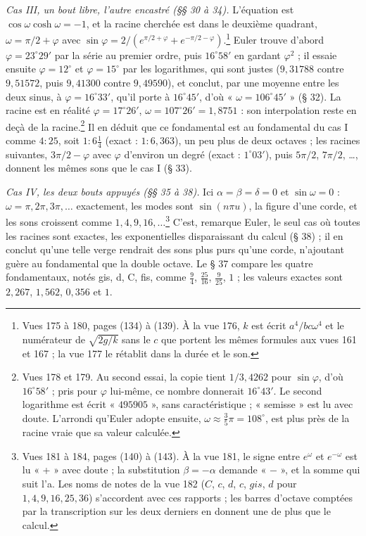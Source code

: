 \documentclass[11pt,a4paper]{article}
\begin{document}
\emph{Cas III, un bout libre, l'autre encastré (§§ 30 à 34).} L'équation est $\cos\omega\cosh\omega=-1$, et la racine cherchée est dans le deuxième quadrant, $\omega=\pi/2+\varphi$ avec $\sin\varphi=2/(e^{\pi/2+\varphi}+e^{-\pi/2-\varphi})$.\footnote{Vues 175 à 180, pages (134) à (139). À la vue 176, $k$ est écrit $a^4/bc\omega^4$ et le numérateur de $\sqrt{2g/k}$ sans le $c$ que portent les mêmes formules aux vues 161 et 167 ; la vue 177 le rétablit dans la durée et le son.} Euler trouve d'abord $\varphi=23^\circ 29'$ par la série au premier ordre, puis $16^\circ 58'$ en gardant $\varphi^2$ ; il essaie ensuite $\varphi=12^\circ$ et $\varphi=15^\circ$ par les logarithmes, qui sont justes ($9{,}31788$ contre $9{,}51572$, puis $9{,}41300$ contre $9{,}49590$), et conclut, par une moyenne entre les deux sinus, à $\varphi=16^\circ 33'$, qu'il porte à $16^\circ 45'$, d'où « $\omega=106^\circ 45'$ » (§ 32). La racine est en réalité $\varphi=17^\circ 26'$, $\omega=107^\circ 26'=1{,}8751$ : son interpolation reste en deçà de la racine.\footnote{Vues 178 et 179. Au second essai, la copie tient $1/3{,}4262$ pour $\sin\varphi$, d'où $16^\circ 58'$ ; pris pour $\varphi$ lui-même, ce nombre donnerait $16^\circ 43'$. Le second logarithme est écrit « $495905$ », sans caractéristique ; « semisse » est lu avec doute. L'arrondi qu'Euler adopte ensuite, $\omega\approx\frac35\pi=108^\circ$, est plus près de la racine vraie que sa valeur calculée.} Il en déduit que ce fondamental est au fondamental du cas I comme $4:25$, soit $1:6\frac14$ (exact : $1:6{,}363$), un peu plus de deux octaves ; les racines suivantes, $3\pi/2-\varphi$ avec $\varphi$ d'environ un degré (exact : $1^\circ 03'$), puis $5\pi/2$, $7\pi/2$, …, donnent les mêmes sons que le cas I (§ 33).

\emph{Cas IV, les deux bouts appuyés (§§ 35 à 38).} Ici $\alpha=\beta=\delta=0$ et $\sin\omega=0$ : $\omega=\pi,2\pi,3\pi,\dots$ exactement, les modes sont $\sin(n\pi u)$, la figure d'une corde, et les sons croissent comme $1,4,9,16,\dots$\footnote{Vues 181 à 184, pages (140) à (143). À la vue 181, le signe entre $e^\omega$ et $e^{-\omega}$ est lu « + » avec doute ; la substitution $\beta=-\alpha$ demande « $-$ », et la somme qui suit l'a. Les noms de notes de la vue 182 ($C$, $c$, $d$, $c$, $gis$, $d$ pour $1,4,9,16,25,36$) s'accordent avec ces rapports ; les barres d'octave comptées par la transcription sur les deux derniers en donnent une de plus que le calcul.} C'est, remarque Euler, le seul cas où toutes les racines sont exactes, les exponentielles disparaissant du calcul (§ 38) ; il en conclut qu'une telle verge rendrait des sons plus purs qu'une corde, n'ajoutant guère au fondamental que la double octave. Le § 37 compare les quatre fondamentaux, notés gis, d, C, fis, comme $\frac94$, $\frac{25}{16}$, $\frac{9}{25}$, $1$ ; les valeurs exactes sont $2{,}267$, $1{,}562$, $0{,}356$ et $1$.
\end{document}
